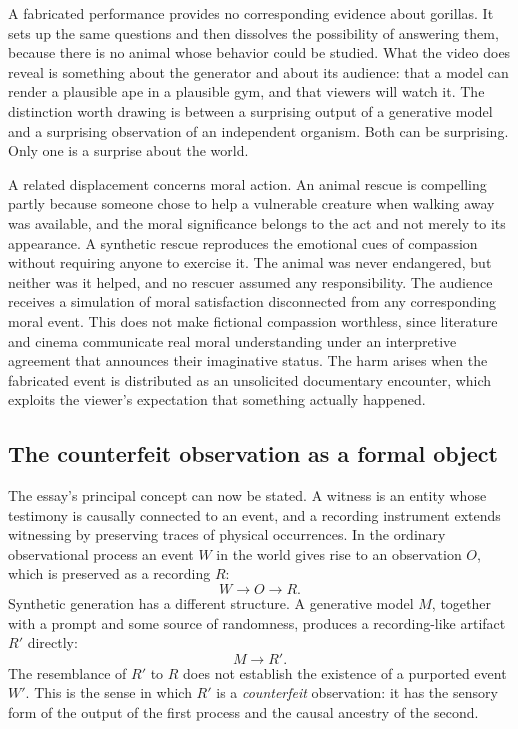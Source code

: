 \documentclass[12pt]{article}
\theoremstyle{plain}
\theoremstyle{definition}
\theoremstyle{remark}
\begin{document}
A fabricated performance provides no corresponding evidence about gorillas. It sets up the same questions and then dissolves the possibility of answering them, because there is no animal whose behavior could be studied. What the video does reveal is something about the generator and about its audience: that a model can render a plausible ape in a plausible gym, and that viewers will watch it. The distinction worth drawing is between a surprising output of a generative model and a surprising observation of an independent organism. Both can be surprising. Only one is a surprise about the world.

A related displacement concerns moral action. An animal rescue is compelling partly because someone chose to help a vulnerable creature when walking away was available, and the moral significance belongs to the act and not merely to its appearance. A synthetic rescue reproduces the emotional cues of compassion without requiring anyone to exercise it. The animal was never endangered, but neither was it helped, and no rescuer assumed any responsibility. The audience receives a simulation of moral satisfaction disconnected from any corresponding moral event. This does not make fictional compassion worthless, since literature and cinema communicate real moral understanding under an interpretive agreement that announces their imaginative status. The harm arises when the fabricated event is distributed as an unsolicited documentary encounter, which exploits the viewer's expectation that something actually happened.

\subsection{The counterfeit observation as a formal object}

The essay's principal concept can now be stated. A witness is an entity whose testimony is causally connected to an event, and a recording instrument extends witnessing by preserving traces of physical occurrences. In the ordinary observational process an event $W$ in the world gives rise to an observation $O$, which is preserved as a recording $R$:
\[
W \longrightarrow O \longrightarrow R .
\]
Synthetic generation has a different structure. A generative model $M$, together with a prompt and some source of randomness, produces a recording-like artifact $R'$ directly:
\[
M \longrightarrow R' .
\]
The resemblance of $R'$ to $R$ does not establish the existence of a purported event $W'$. This is the sense in which $R'$ is a \emph{counterfeit} observation: it has the sensory form of the output of the first process and the causal ancestry of the second.
\end{document}
